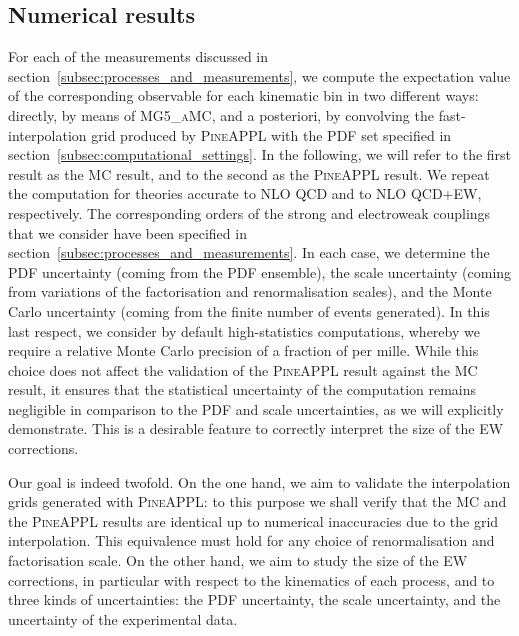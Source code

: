 \subsection{Numerical results}
\label{subsec:numerical_results}

For each of the measurements discussed in
section~\ref{subsec:processes_and_measurements}, we compute the expectation
value of the corresponding observable for each kinematic bin in two different
ways: directly, by means of \textsc{MG5\_aMC}, and a posteriori, by convolving
the fast-interpolation grid produced by \textsc{PineAPPL} with the PDF set
specified in section~\ref{subsec:computational_settings}. In the following, we
will refer to the first result as the \textsc{MC} result, and to the second as
the \textsc{PineAPPL} result. We repeat the computation for theories accurate
to NLO QCD and to NLO QCD+EW, respectively. The corresponding orders of the
strong and electroweak couplings that we consider have been specified in
section~\ref{subsec:processes_and_measurements}. In each case, we determine the
PDF uncertainty (coming from the PDF ensemble), the scale uncertainty (coming
from variations of the factorisation and renormalisation scales), and the Monte
Carlo uncertainty (coming from the finite number of events generated). In this
last respect, we consider by default high-statistics computations, whereby we
require a relative Monte Carlo precision of a fraction of per mille. While
this choice does not affect the validation of the \textsc{PineAPPL} result
against the \textsc{MC} result, it ensures that the statistical uncertainty of
the computation remains negligible in comparison to the PDF and scale
uncertainties, as we will explicitly demonstrate. This is a desirable feature
to correctly interpret the size of the EW corrections.

Our goal is indeed twofold. On the one hand, we aim to validate the
interpolation grids generated with \textsc{PineAPPL}: to this purpose we shall
verify that the MC and the \textsc{PineAPPL} results are identical up to
numerical inaccuracies due to the grid interpolation. This equivalence must
hold for any choice of renormalisation and factorisation scale. On the other
hand, we aim to study the size of the EW corrections, in particular with
respect to the kinematics of each process, and to three kinds of uncertainties:
the PDF uncertainty, the scale uncertainty, and the uncertainty of the
experimental data.

